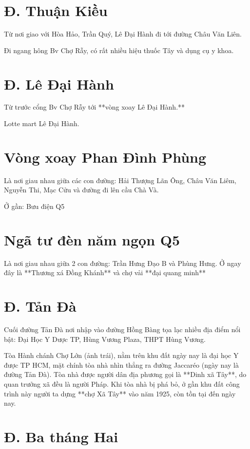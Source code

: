 \section{Đ. Thuận Kiều}

Từ nơi giao với Hòa Hảo, Trần Quý, Lê Đại Hành đi tới đường Châu Văn Liên.

Đi ngang hông Bv Chợ Rẫy, có rất nhiều hiệu thuốc Tây và dụng cụ y khoa.

\section{Đ. Lê Đại Hành}

Từ trước cổng Bv Chợ Rẫy tới **vòng xoay Lê Đại Hành.**

Lotte mart Lê Đại Hành.

\section{Vòng xoay Phan Đình Phùng}

Là nơi giau nhau giữa các con đường: Hải Thượng Lãn Ông, Châu Văn Liêm, Nguyễn Thi, Mạc Cửu và đường đi lên cầu Chà Và.

Ở gần: Bưu điện Q5

\section{Ngã tư đèn năm ngọn Q5}

Là nơi giau nhau giữa 2 con đường: Trần Hưng Đạo B và Phùng Hưng. Ở ngay đây là **Thương xá Đồng Khánh** và chợ vải **đại quang minh**

\section{Đ. Tản Đà}

Cuối đường Tản Đà nơi nhập vào đường Hồng Bàng tọa lạc nhiều địa điểm nổi bật: Đại Học Y Dược TP, Hùng Vương Plaza, THPT Hùng Vương.

Tòa Hành chánh Chợ Lớn (ảnh trái), nằm trên khu đất ngày nay là đại học Y được TP HCM, mặt chính tòa nhà nhìn thẳng ra đường Jaccaréo (ngày nay là đường Tản Đà). Tòa nhà được người dân địa phương gọi là **Dinh xã Tây**, do quan trưởng xã đều là người Pháp. Khi tòa nhà bị phá bỏ, ở gần khu đất công trình này người ta dựng **chợ Xã Tây** vào năm 1925, còn tồn tại đến ngày nay.

\section{Đ. Ba tháng Hai}

